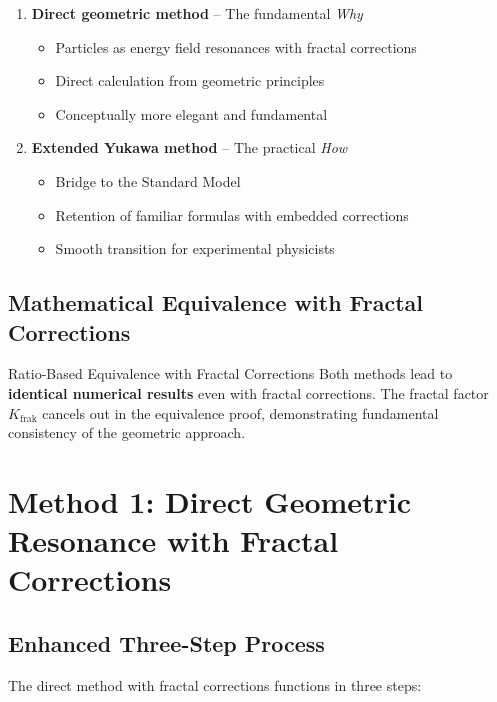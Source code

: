 \documentclass[12pt,a4paper]{article}
\begin{document}
	\begin{enumerate}
		\item \textbf{Direct geometric method} -- The fundamental \textit{Why}
		\begin{itemize}
			\item Particles as energy field resonances with fractal corrections
			\item Direct calculation from geometric principles
			\item Conceptually more elegant and fundamental
		\end{itemize}
		
		\item \textbf{Extended Yukawa method} -- The practical \textit{How}
		\begin{itemize}
			\item Bridge to the Standard Model
			\item Retention of familiar formulas with embedded corrections
			\item Smooth transition for experimental physicists
		\end{itemize}
	\end{enumerate}
	
	\subsection{Mathematical Equivalence with Fractal Corrections}
	\label{subsec:mathematical_equivalence}
	
	\begin{keyresult}{Ratio-Based Equivalence with Fractal Corrections}{}
		Both methods lead to \textbf{identical numerical results} even with fractal corrections. The fractal factor $K_{\text{frak}}$ cancels out in the equivalence proof, demonstrating fundamental consistency of the geometric approach.
	\end{keyresult}
	
	\section{Method 1: Direct Geometric Resonance with Fractal Corrections}
	\label{sec:direct_geometric_method}
	
	\subsection{Enhanced Three-Step Process}
	\label{subsec:enhanced_process}
	
	The direct method with fractal corrections functions in three steps:
	
\end{document}
